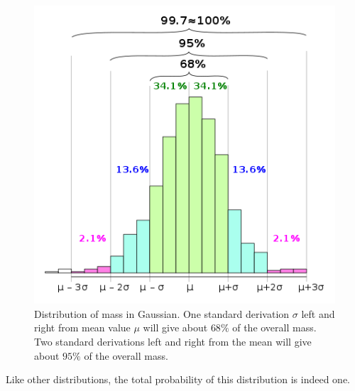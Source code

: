 \begin{figure}[H]
	\centering
	\includegraphics[width=120mm]{16.png}
	\caption{Distribution of mass in Gaussian. One standard derivation $\sigma$ left and right from mean value $\mu$ will give about $68\%$ of the overall mass. Two standard derivations left and right from the mean will give about $95\%$ of the overall mass.}
\end{figure}

Like other distributions, the total probability of this distribution is indeed one.

